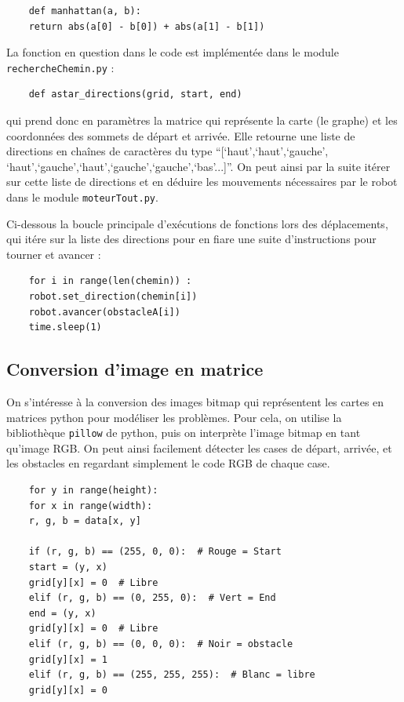 \documentclass[a4paper,12pt]{report}  %
\begin{document}
\begin{lstlisting}
	def manhattan(a, b):
	return abs(a[0] - b[0]) + abs(a[1] - b[1])
\end{lstlisting}


La fonction en question dans le code est implémentée dans le module \texttt{rechercheChemin.py} : 
\begin{lstlisting}
	def astar_directions(grid, start, end)
\end{lstlisting}

qui prend donc en paramètres la matrice qui représente la carte (le graphe) et les coordonnées des sommets de départ et arrivée. Elle retourne une liste de directions en chaînes de caractères du type “[‘haut’,‘haut’,‘gauche’, ‘haut’,‘gauche’,‘haut’,‘gauche’,‘gauche’,‘bas’...]”. On peut ainsi par la suite itérer sur cette liste de directions et en déduire les mouvements nécessaires par le robot dans le module \texttt{moteurTout.py}.

Ci-dessous la boucle principale d’exécutions de fonctions lors des déplacements, qui itére sur la liste des directions pour en fiare une suite d’instructions pour tourner et avancer :
\begin{lstlisting}
	for i in range(len(chemin)) :
	robot.set_direction(chemin[i])
	robot.avancer(obstacleA[i])
	time.sleep(1)
\end{lstlisting}

\subsection{Conversion d’image en matrice}
On s'intéresse à la conversion des images bitmap qui représentent les cartes en matrices python pour modéliser les problèmes. Pour cela, on utilise la bibliothèque \texttt{pillow} de python, puis on interprète l’image bitmap en tant qu’image RGB. On peut ainsi facilement détecter les cases de départ, arrivée, et les obstacles en regardant simplement le code RGB de chaque case.

\begin{lstlisting}
	for y in range(height):
	for x in range(width):
	r, g, b = data[x, y]
	
	if (r, g, b) == (255, 0, 0):  # Rouge = Start
	start = (y, x)
	grid[y][x] = 0  # Libre
	elif (r, g, b) == (0, 255, 0):  # Vert = End
	end = (y, x)
	grid[y][x] = 0  # Libre
	elif (r, g, b) == (0, 0, 0):  # Noir = obstacle
	grid[y][x] = 1
	elif (r, g, b) == (255, 255, 255):  # Blanc = libre
	grid[y][x] = 0
\end{lstlisting}
\end{document}
